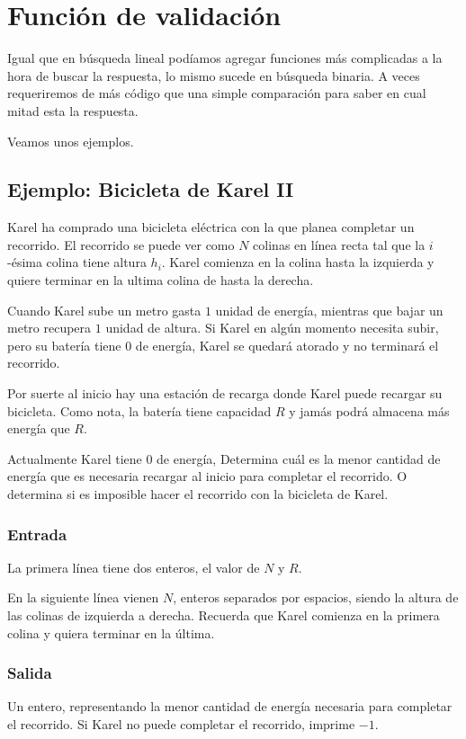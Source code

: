 \section{Función de validación}
Igual que en búsqueda lineal podíamos agregar funciones más complicadas a la hora de buscar la respuesta, lo mismo sucede en búsqueda binaria. A veces requeriremos de más código que una simple comparación para saber en cual mitad esta la respuesta.

Veamos unos ejemplos.


\subsection*{Ejemplo: Bicicleta de Karel II}
Karel ha comprado una bicicleta eléctrica con la que planea completar un recorrido. El recorrido se puede ver como \(N\) colinas en línea recta tal que la \(i\)-ésima colina tiene altura \(h_i\). Karel comienza en la colina hasta la izquierda y quiere terminar en la ultima colina de hasta la derecha.

Cuando Karel sube un metro gasta \(1\) unidad de energía, mientras que bajar un metro recupera \(1\) unidad de altura. Si Karel en algún momento necesita subir, pero su batería tiene 0 de energía, Karel se quedará atorado y no terminará el recorrido.

Por suerte al inicio hay una estación de recarga donde Karel puede recargar su bicicleta. Como nota, la batería tiene capacidad \(R\) y jamás podrá almacena más energía que \(R\).

Actualmente Karel tiene \(0\) de energía, Determina cuál es la menor cantidad de energía que es necesaria recargar al inicio para completar el recorrido. O determina si es imposible hacer el recorrido con la bicicleta de Karel.

\subsubsection*{Entrada}
La primera línea tiene dos enteros, el valor de \(N\) y \(R\).

En la siguiente línea vienen \(N\), enteros separados por espacios, siendo la altura de las colinas de izquierda a derecha. Recuerda que Karel comienza en la primera colina y quiera terminar en la última.
\subsubsection*{Salida}
Un entero, representando la menor cantidad de energía necesaria para completar el recorrido. Si Karel no puede completar el recorrido, imprime \(-1\).

